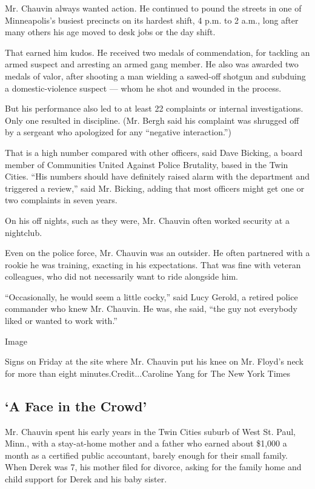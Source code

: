 Mr. Chauvin always wanted action. He continued to pound the streets in
one of Minneapolis's busiest precincts on its hardest shift, 4 p.m. to 2
a.m., long after many others his age moved to desk jobs or the day
shift.

That earned him kudos. He received two medals of commendation, for
tackling an armed suspect and arresting an armed gang member. He also
was awarded two medals of valor, after shooting a man wielding a
sawed-off shotgun and subduing a domestic-violence suspect --- whom he
shot and wounded in the process.

But his performance also led to at least 22 complaints or internal
investigations. Only one resulted in discipline. (Mr. Bergh said his
complaint was shrugged off by a sergeant who apologized for any
``negative interaction.'')

That is a high number compared with other officers, said Dave Bicking, a
board member of Communities United Against Police Brutality, based in
the Twin Cities. ``His numbers should have definitely raised alarm with
the department and triggered a review,'' said Mr. Bicking, adding that
most officers might get one or two complaints in seven years.

On his off nights, such as they were, Mr. Chauvin often worked security
at a nightclub.

Even on the police force, Mr. Chauvin was an outsider. He often
partnered with a rookie he was training, exacting in his expectations.
That was fine with veteran colleagues, who did not necessarily want to
ride alongside him.

``Occasionally, he would seem a little cocky,'' said Lucy Gerold, a
retired police commander who knew Mr. Chauvin. He was, she said, ``the
guy not everybody liked or wanted to work with.''

Image

Signs on Friday at the site where Mr. Chauvin put his knee on Mr.
Floyd's neck for more than eight minutes.Credit...Caroline Yang for The
New York Times

\hypertarget{a-face-in-the-crowd}{%
\subsection{`A Face in the Crowd'}\label{a-face-in-the-crowd}}

Mr. Chauvin spent his early years in the Twin Cities suburb of West St.
Paul, Minn., with a stay-at-home mother and a father who earned about
\$1,000 a month as a certified public accountant, barely enough for
their small family. When Derek was 7, his mother filed for divorce,
asking for the family home and child support for Derek and his baby
sister.

